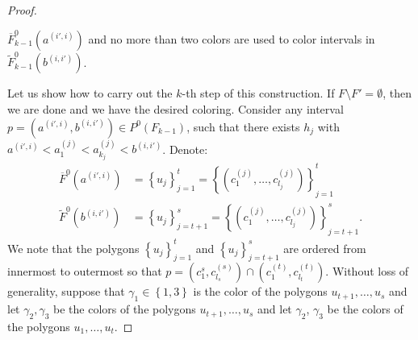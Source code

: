 \documentclass[12pt]{article}
\theoremstyle{definition}
\begin{document}
\begin{proof}
\begin{enumerate}
             $\overline{F}_{k-1}^{0}\left(a^{\left(i', i\right)}\right)$ 
             and no more than two colors are used
             to color intervals in
             $\widetilde{F}_{k-1}^{0}\left(b^{\left(i,i'\right)}\right)$.
         \end{enumerate}
         Let us show how to carry out
         the $k$-th step of this
         construction.
         If $F \setminus F' = \emptyset$,
         then we are done and we have
         the desired coloring.
         Consider any interval
         $p = \left(a^{\left(i', i\right)},
         b^{\left(i, i'\right)}\right)
         \in P^{0}\left(F_{k-1}\right)$,
         such that there
         exists $h_{j}$ with
         $a^{\left(i', i\right)} <
         a_1^{\left(j\right)} < a_{k_{j}}^{\left(j\right)}
         < b^{\left(i, i'\right)}$.
         Denote:
         \begin{align*}
             \overline{F}^{0}\left(a^{\left(i', i\right)}\right) &= 
             \left\{u_{j}\right\}_{j = 1}^{t} = 
             \left\{\left(c_1^{\left(j\right)}, \ldots, 
             c_{l_{j}}^{\left(j\right)}\right)\right\}_{j =1}^{t} \\
             \widetilde{F}^{0}\left(b^{\left(i, i'\right)}\right) &= 
             \left\{u_{j}\right\}_{j = t+1}^{s} = 
             \left\{\left(c_1^{\left(j\right)}, \ldots,
             c_{l_{j}}^{\left(j\right)}\right)\right\}_{j =t +1}^{s}.
         \end{align*}
         We note that the polygons
         $\left\{u_{j}\right\}_{j=1}^{t}$ 
         and $\left\{u_{j}\right\}_{j=t+1}^{s}$ 
         are ordered from innermost
         to outermost so that
         $p = \left(c_1^{s}, c_{l_{s}}^{\left(s\right)}\right)
         \cap \left(c_1^{\left(t\right)},
         c_{l_{t}}^{\left(t\right)}\right)$.
         Without loss of generality,
         suppose that $\gamma_1 \in 
         \left\{1, 3\right\}$ is the
         color of the polygons 
         $u_{t+1}, \ldots, u_{s}$ 
         and let $\gamma_2, \gamma_3$
         be the colors of the polygons
         $u_{t+1}, \ldots, u_{s}$ 
         and let $\gamma_2$, $\gamma_3$
         be the colors of the polygons
         $u_1, \ldots, u_{t}$.
         

\end{proof}
\end{document}
